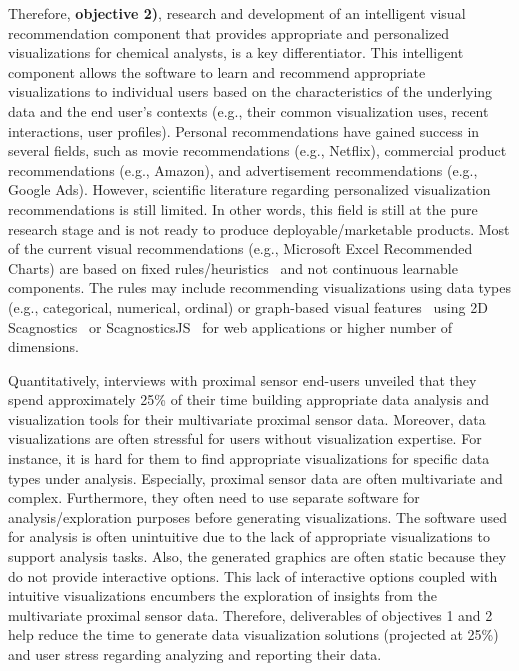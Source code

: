 Therefore, \textbf{objective 2)}, research and development of an intelligent visual recommendation component that provides appropriate and personalized visualizations for chemical analysts, is a key differentiator. This intelligent component allows the software to learn and recommend appropriate visualizations to individual users based on the characteristics of the underlying data and the end user's contexts (e.g., their common visualization uses, recent interactions, user profiles). Personal recommendations have gained success in several fields, such as movie recommendations (e.g., Netflix), commercial product recommendations (e.g., Amazon), and advertisement recommendations (e.g., Google Ads). However, scientific literature regarding personalized visualization recommendations is still limited. In other words, this field is still at the pure research stage and is not ready to produce deployable/marketable products. Most of the current visual recommendations (e.g., Microsoft Excel Recommended Charts) are based on fixed rules/heuristics~\cite{ShowMe} and not continuous learnable components. The rules may include recommending visualizations using data types (e.g., categorical, numerical, ordinal) or graph-based visual features~\cite{outliagnostics, pham2019mtsad} using 2D Scagnostics~\cite{Wilkinson2005} or ScagnosticsJS~\cite{pham2020scagnosticsjs} for web applications or higher number of dimensions.


Quantitatively, interviews with proximal sensor end-users unveiled that they spend approximately 25\% of their time building appropriate data analysis and visualization tools for their multivariate proximal sensor data. Moreover, data visualizations are often stressful for users without visualization expertise. For instance, it is hard for them to find appropriate visualizations for specific data types under analysis. Especially, proximal sensor data are often multivariate and complex. Furthermore, they often need to use separate software for analysis/exploration purposes before generating visualizations. The software used for analysis is often unintuitive due to the lack of appropriate visualizations to support analysis tasks. Also, the generated graphics are often static because they do not provide interactive options. This lack of interactive options coupled with intuitive visualizations encumbers the exploration of insights from the multivariate proximal sensor data. Therefore, deliverables of objectives 1 and 2 help reduce the time to generate data visualization solutions (projected at 25\%) and user stress regarding analyzing and reporting their data.


